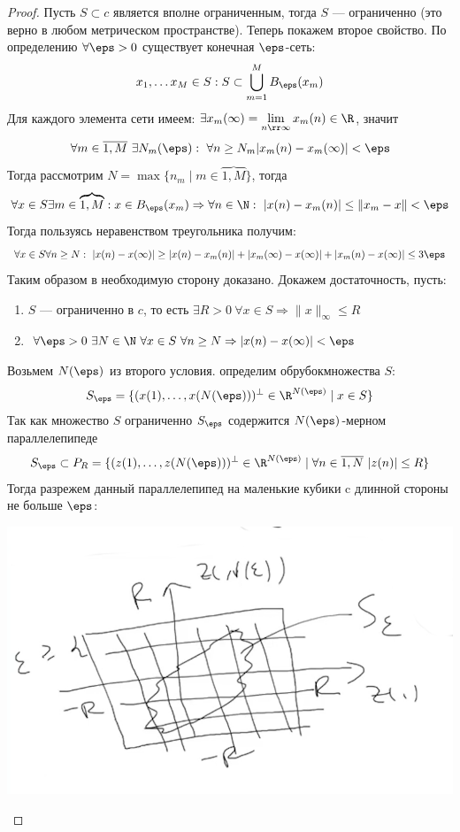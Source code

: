 \begin{proof}
	Пусть $S \subset c$ является вполне ограниченным, тогда $S$ --- ограниченно (это верно в любом метрическом пространстве). Теперь покажем второе свойство. По определению $\forall \eps > 0$ существует конечная $\eps$-сеть: 
	$$
	x_1, \dots x_M \in S: S \subset \bigcup_{m=1}^M B_\eps(x_m)
	$$
	Для каждого элемента сети имеем: $\exists x_m(\infty) = \lim\limits_{n \rr \infty} x_m(n) \in \R$, значит
	$$
	\forall m \in \overline{1, M} \ \exists N_m(\eps): \ \forall n \geq N_m |x_m(n) - x_m(\infty)| < \eps
	$$
	Тогда рассмотрим $N = \max\{ n_m \mid m \in \overbrace{1,M}\}$, тогда 
	$$
	\forall x \in S \exists m \in \overbrace{1, M} : x \in B_\eps(x_m) \Rightarrow  \forall n \in \N: \ |x(n) - x_m(n)| \leq \|x_m - x\| < \eps
	$$
	Тогда пользуясь неравенством треугольника получим:
	$$
	\forall x \in S \forall n \geq N: \ |x(n) - x(\infty)| \geq |x(n) - x_m(n)| + |x_m(\infty) - x(\infty)| + |x_m(n) - x(\infty)| \leq 3\eps 
	$$
	Таким образом в необходимую сторону доказано. Докажем достаточность, пусть:
	\begin{enumerate}
		\item $S$ --- ограниченно в $c$, то есть $\exists R > 0  \ \forall x \in S \Rightarrow \|x\|_\infty \leq R$
		\item $\forall \eps > 0 \ \exists N \in \N \ \forall x \in S \ \forall n \geq N \Rightarrow |x(n) - x(\infty)| < \eps$
	\end{enumerate}
	Возьмем $N(\eps)$ из второго условия. определим  обрубок\grqq множества $S$:
	$$
	S_\eps = \{(x(1), \dots, x(N(\eps)))^\perp \in \R^{N(\eps)} \mid x \in S\}
	$$
	Так как множество $S$ ограниченно $S_\eps$ содержится $N(\eps)$-мерном параллелепипеде 
	$$
	S_\eps \subset P_R = \{(z(1), \dots, z(N(\eps)))^\perp  \in \R^{N(\eps)}\mid \forall n \in \overline{1, N} \ |z(n)| \leq R \}
	$$
	Тогда разрежем данный параллелепипед на маленькие кубики c длинной стороны не больше $\eps$: 
	\begin{center}
\includegraphics[scale=0.4]{pic/2022-01-22_16-29}
	\end{center}
	

\end{proof}
